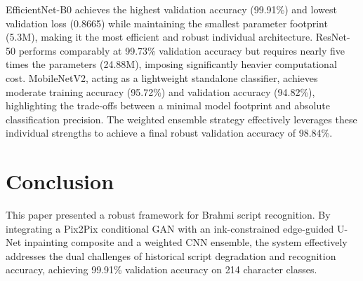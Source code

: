 \documentclass[conference]{IEEEtran}
\begin{document}
\begin{table}[H]
\centering
\caption{CNN Model Complexity and Recognition Performance (Precision Peak Analysis)}
\label{tab:cnn_results}
\end{table}

EfficientNet-B0 achieves the highest validation accuracy (99.91\%) and lowest validation loss (0.8665) while maintaining the smallest parameter footprint (5.3M), making it the most efficient and robust individual architecture. ResNet-50 performs comparably at 99.73\% validation accuracy but requires nearly five times the parameters (24.88M), imposing significantly heavier computational cost. MobileNetV2, acting as a lightweight standalone classifier, achieves moderate training accuracy (95.72\%) and validation accuracy (94.82\%), highlighting the trade-offs between a minimal model footprint and absolute classification precision. The weighted ensemble strategy effectively leverages these individual strengths to achieve a final robust validation accuracy of 98.84\%.

\section{Conclusion}

This paper presented a robust framework for Brahmi script recognition. By integrating a Pix2Pix conditional GAN with an ink-constrained edge-guided U-Net inpainting composite and a weighted CNN ensemble, the system effectively addresses the dual challenges of historical script degradation and recognition accuracy, achieving 99.91\% validation accuracy on 214 character classes.
\end{document}
